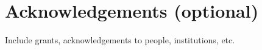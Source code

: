 \section*{Acknowledgements (optional)}
    Include grants, acknowledgements to people, institutions, etc.